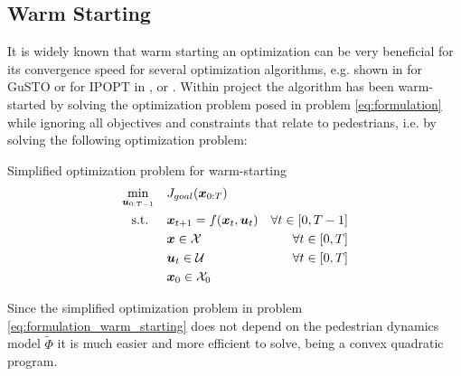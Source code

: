 \subsection{Warm Starting}
\label{text:approach/runtime/warm_starting}
It is widely known that warm starting an optimization can be very beneficial for its convergence speed for several optimization algorithms, e.g. shown in \cite{Banerjee2020} for \ac{GuSTO} or for \ac{IPOPT} in \cite{Shahzad2010}, \cite{John2008} or \cite{Spielberge2019}.
\newline
Within project \project the algorithm has been warm-started by solving the optimization problem posed in problem \ref{eq:formulation} while ignoring all objectives and constraints that relate to pedestrians, i.e. by solving the following optimization problem: \\

\begin{problem}{Simplified \project optimization problem for warm-starting}
\begin{align}
\min_{\boldsymbol{u}_{0:T-1}} \quad & J_{goal}(\boldsymbol{x}_{0:T}) \\
\textrm{s.t. } \quad & \boldsymbol{x}_{t+1} = f(\boldsymbol{x}_t, \boldsymbol{u}_t) & \forall t \in [0, T - 1] \\
& \boldsymbol{x} \in \mathcal{X} & \forall t \in [0, T]\\
& \boldsymbol{u}_t \in \mathcal{U} & \forall t \in [0, T]\\
& \boldsymbol{x}_0 \in \mathcal{X}_0
\end{align} 
\label{eq:formulation_warm_starting}
\end{problem}

Since the simplified optimization problem in problem \ref{eq:formulation_warm_starting} does not depend on the pedestrian dynamics model $\tilde{\Phi}$ it is much easier and more efficient to solve, being a convex quadratic program. \\

\begin{figure}[!ht]
\begin{center}
\end{center}
\label{img:robot_goal_encoding}
\end{figure}

